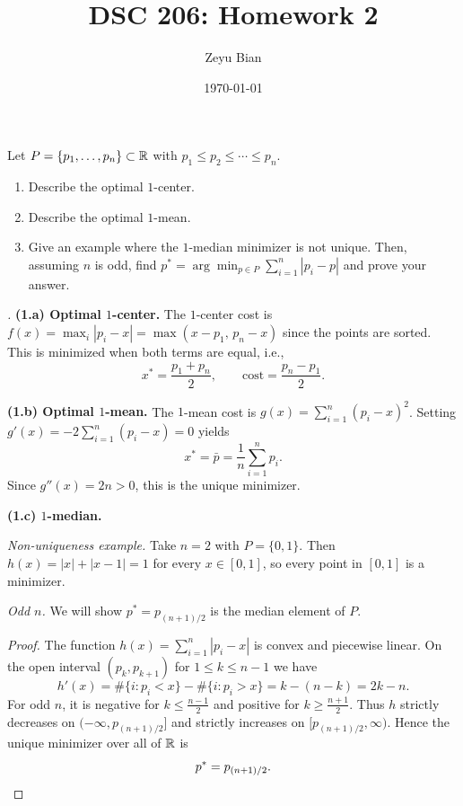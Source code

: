 \documentclass[en,hazy,blue,12pt,normal]{../../elegantnote}
\title{DSC 206: Homework 2}
\author{Zeyu Bian}
\date{\today}
\begin{document}
\maketitle

\begin{homework}
 Let $P=\{p_1,\dots,p_n\}\subset\mathbb R$ with $p_1\le p_2\le\cdots\le p_n$.
\begin{enumerate}
    \item[(1.a)] Describe the optimal $1$-center.
    \item[(1.b)] Describe the optimal $1$-mean.
    \item[(1.c)] Give an example where the $1$-median minimizer is not unique. Then, assuming $n$ is odd, find $p^*=\arg\min_{p\in P}\sum_{i=1}^n |p_i-p|$ and prove your answer.
\end{enumerate}
\end{homework}

\begin{proof}[\solutionname]

\textbf{(1.a) Optimal $1$-center.}
The $1$-center cost is $f(x)=\max_i |p_i-x|=\max(x-p_1,\,p_n-x)$ since the points are sorted. This is minimized when both terms are equal, i.e.,
\[
x^*=\frac{p_1+p_n}{2},\qquad \text{cost}=\frac{p_n-p_1}{2}.
\]

\textbf{(1.b) Optimal $1$-mean.}
The $1$-mean cost is $g(x)=\sum_{i=1}^n (p_i-x)^2$. Setting $g'(x)=-2\sum_{i=1}^n(p_i-x)=0$ yields
\[
x^*=\bar p=\frac{1}{n}\sum_{i=1}^n p_i.
\]
Since $g''(x)=2n>0$, this is the unique minimizer.

\textbf{(1.c) $1$-median.}

\emph{Non-uniqueness example.} Take $n=2$ with $P=\{0,1\}$. Then $h(x)=|x|+|x-1|=1$ for every $x\in[0,1]$, so every point in $[0,1]$ is a minimizer.

\emph{Odd $n$.} We will show $p^*=p_{(n+1)/2}$ is the median element of $P$.

\emph{Proof.} The function $h(x)=\sum_{i=1}^n|p_i-x|$ is convex and piecewise linear. On the open interval $(p_k,p_{k+1})$ for $1\le k\le n-1$ we have
\[
h'(x)=\#\{i:p_i<x\}-\#\{i:p_i>x\}=k-(n-k)=2k-n.
\]
For odd $n$, it is negative for $k\le \frac{n-1}{2}$ and positive for $k\ge \frac{n+1}{2}$. Thus $h$ strictly decreases on $(-\infty,p_{(n+1)/2}]$ and strictly increases on $[p_{(n+1)/2},\infty)$. Hence the unique minimizer over all of $\mathbb R$ is
\[
p^*=p_{(n+1)/2}.\qedhere
\]
\end{proof}
\end{document}
